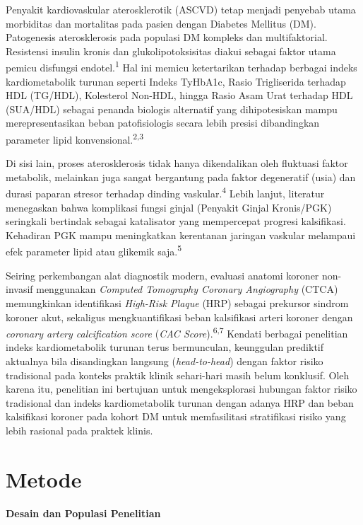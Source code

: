 \documentclass[
  indonesian,
]{agujournal2019}
\begin{document}
Penyakit kardiovaskular aterosklerotik (ASCVD) tetap menjadi penyebab
utama morbiditas dan mortalitas pada pasien dengan Diabetes Mellitus
(DM). Patogenesis aterosklerosis pada populasi DM kompleks dan
multifaktorial. Resistensi insulin kronis dan glukolipotoksisitas diakui
sebagai faktor utama pemicu disfungsi endotel.\textsuperscript{1} Hal
ini memicu ketertarikan terhadap berbagai indeks kardiometabolik turunan
seperti Indeks TyHbA1c, Rasio Trigliserida terhadap HDL (TG/HDL),
Kolesterol Non-HDL, hingga Rasio Asam Urat terhadap HDL (SUA/HDL)
sebagai penanda biologis alternatif yang dihipotesiskan mampu
merepresentasikan beban patofisiologis secara lebih presisi dibandingkan
parameter lipid konvensional.\textsuperscript{2,3}

Di sisi lain, proses aterosklerosis tidak hanya dikendalikan oleh
fluktuasi faktor metabolik, melainkan juga sangat bergantung pada faktor
degeneratif (usia) dan durasi paparan stresor terhadap dinding
vaskular.\textsuperscript{4} Lebih lanjut, literatur menegaskan bahwa
komplikasi fungsi ginjal (Penyakit Ginjal Kronis/PGK) seringkali
bertindak sebagai katalisator yang mempercepat progresi kalsifikasi.
Kehadiran PGK mampu meningkatkan kerentanan jaringan vaskular melampaui
efek parameter lipid atau glikemik saja.\textsuperscript{5}

Seiring perkembangan alat diagnostik modern, evaluasi anatomi koroner
non-invasif menggunakan \emph{Computed Tomography Coronary Angiography}
(CTCA) memungkinkan identifikasi \emph{High-Risk Plaque} (HRP) sebagai
prekursor sindrom koroner akut, sekaligus mengkuantifikasi beban
kalsifikasi arteri koroner dengan \emph{coronary artery calcification
score} (\emph{CAC Score}).\textsuperscript{6,7} Kendati berbagai
penelitian indeks kardiometabolik turunan terus bermunculan, keunggulan
prediktif aktualnya bila disandingkan langsung (\emph{head-to-head})
dengan faktor risiko tradisional pada konteks praktik klinik sehari-hari
masih belum konklusif. Oleh karena itu, penelitian ini bertujuan untuk
mengeksplorasi hubungan faktor risiko tradisional dan indeks
kardiometabolik turunan dengan adanya HRP dan beban kalsifikasi koroner
pada kohort DM untuk memfasilitasi stratifikasi risiko yang lebih
rasional pada praktek klinis.

\section{Metode}\label{metode}

\textbf{Desain dan Populasi Penelitian}
\end{document}
